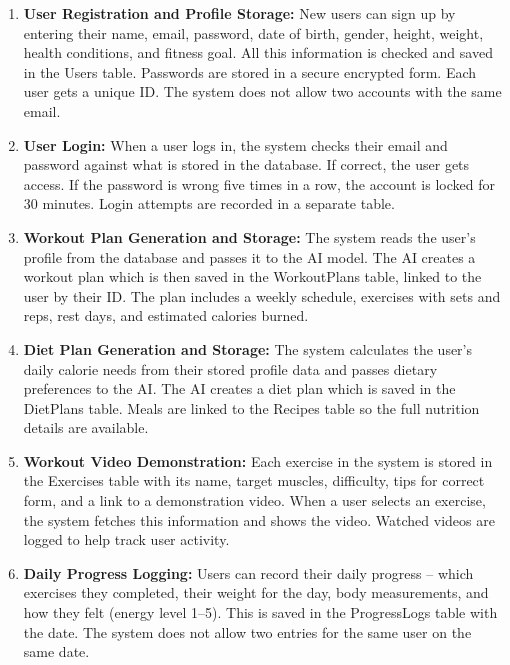 \documentclass[12pt,a4paper]{article}
\begin{document}
\begin{enumerate}[leftmargin=*, label=\textbf{SF-\arabic*.}, itemsep=5pt]

  \item \textbf{User Registration and Profile Storage:}
  New users can sign up by entering their name, email, password, date of birth, gender,
  height, weight, health conditions, and fitness goal. All this information is checked
  and saved in the Users table. Passwords are stored in a secure encrypted form. Each
  user gets a unique ID. The system does not allow two accounts with the same email.

  \item \textbf{User Login:}
  When a user logs in, the system checks their email and password against what is stored
  in the database. If correct, the user gets access. If the password is wrong five times
  in a row, the account is locked for 30 minutes. Login attempts are recorded in a
  separate table.

  \item \textbf{Workout Plan Generation and Storage:}
  The system reads the user's profile from the database and passes it to the AI model.
  The AI creates a workout plan which is then saved in the WorkoutPlans table, linked
  to the user by their ID. The plan includes a weekly schedule, exercises with sets and
  reps, rest days, and estimated calories burned.

  \item \textbf{Diet Plan Generation and Storage:}
  The system calculates the user's daily calorie needs from their stored profile data
  and passes dietary preferences to the AI. The AI creates a diet plan which is saved
  in the DietPlans table. Meals are linked to the Recipes table so the full nutrition
  details are available.

  \item \textbf{Workout Video Demonstration:}
  Each exercise in the system is stored in the Exercises table with its name, target
  muscles, difficulty, tips for correct form, and a link to a demonstration video. When
  a user selects an exercise, the system fetches this information and shows the video.
  Watched videos are logged to help track user activity.

  \item \textbf{Daily Progress Logging:}
  Users can record their daily progress -- which exercises they completed, their weight
  for the day, body measurements, and how they felt (energy level 1--5). This is saved
  in the ProgressLogs table with the date. The system does not allow two entries for
  the same user on the same date.


\end{enumerate}
\end{document}
